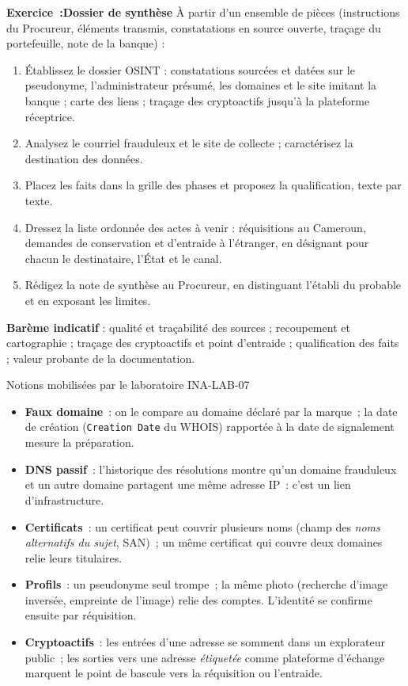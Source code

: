 \begin{boxexo}
\textbf{Exercice~:Dossier de synthèse}
À partir d'un ensemble de pièces (instructions du Procureur, éléments transmis, constatations en source ouverte, traçage du portefeuille, note de la banque) :

\begin{enumerate}
\item Établissez le dossier OSINT : constatations sourcées et datées sur le pseudonyme, l'administrateur présumé, les domaines et le site imitant la banque ; carte des liens ; traçage des cryptoactifs jusqu'à la plateforme réceptrice.
\item Analysez le courriel frauduleux et le site de collecte ; caractérisez la destination des données.
\item Placez les faits dans la grille des phases et proposez la qualification, texte par texte.
\item Dressez la liste ordonnée des actes à venir : réquisitions au Cameroun, demandes de conservation et d'entraide à l'étranger, en désignant pour chacun le destinataire, l'État et le canal.
\item Rédigez la note de synthèse au Procureur, en distinguant l'établi du probable et en exposant les limites.
\end{enumerate}

\textbf{Barème indicatif} : qualité et traçabilité des sources ; recoupement et cartographie ; traçage des cryptoactifs et point d'entraide ; qualification des faits ; valeur probante de la documentation.
\end{boxexo}

\begin{boiteRemarque}{Notions mobilisées par le laboratoire INA-LAB-07}
\begin{itemize}
    \item \textbf{Faux domaine}~: on le compare au domaine déclaré par la
          marque~; la date de création (\texttt{Creation Date} du WHOIS)
          rapportée à la date de signalement mesure la préparation.
    \item \textbf{DNS passif}~: l'historique des résolutions montre qu'un
          domaine frauduleux et un autre domaine partagent une même adresse
          IP~: c'est un lien d'infrastructure.
    \item \textbf{Certificats}~: un certificat peut couvrir plusieurs noms
          (champ des \emph{noms alternatifs du sujet}, SAN)~; un même
          certificat qui couvre deux domaines relie leurs titulaires.
    \item \textbf{Profils}~: un pseudonyme seul trompe~; la même photo
          (recherche d'image inversée, empreinte de l'image) relie des
          comptes. L'identité se confirme ensuite par réquisition.
    \item \textbf{Cryptoactifs}~: les entrées d'une adresse se somment
          dans un explorateur public~; les sorties vers une adresse
          \emph{étiquetée} comme plateforme d'échange marquent le point de
          bascule vers la réquisition ou l'entraide.
\end{itemize}
\end{boiteRemarque}

